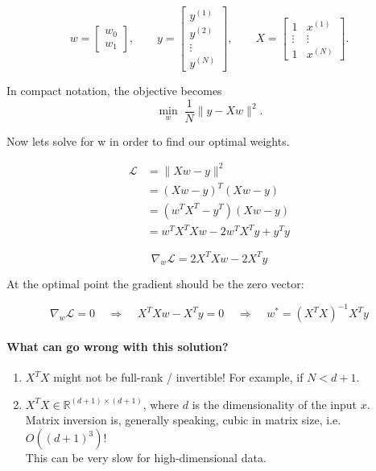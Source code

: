 \documentclass[11pt]{article}
\begin{document}
\[
	w =
	\begin{bmatrix}
		w_0 \\ w_1
	\end{bmatrix},
	\qquad
	y =
	\begin{bmatrix}
		y^{(1)} \\ y^{(2)} \\ \vdots \\ y^{(N)}
	\end{bmatrix},
	\qquad
	X =
	\begin{bmatrix}
		1      & x^{(1)} \\
		\vdots & \vdots  \\
		1      & x^{(N)}
	\end{bmatrix}.
\]

In compact notation, the objective becomes
\[
	\min_{w} \; \frac{1}{N} \|y - Xw\|^2.
\]

Now lets solve for w in order to find our optimal weights.

\begin{align*}
	\mathcal{L} & = \|Xw - y\|^2                      \\
	            & = (Xw - y)^T (Xw - y)               \\
	            & = (w^T X^T - y^T)(Xw - y)           \\
	            & = w^T X^T X w - 2 w^T X^T y + y^T y
\end{align*}

\[
	\nabla_w \mathcal{L} = 2X^T X w - 2X^T y
\]

At the optimal point the gradient should be the zero vector:

\[
	\nabla_w \mathcal{L} = 0 \;\;\;\;\Rightarrow\;\;\;\; X^T X w - X^T y = 0
	\;\;\;\;\Rightarrow\;\;\;\; w^* = (X^T X)^{-1} X^T y
\]


\paragraph{What can go wrong with this solution?}
\begin{enumerate}
	\item $X^T X$ might not be full-rank / invertible! For example, if $N < d+1$.
	\item $X^T X \in \mathbb{R}^{(d+1) \times (d+1)}$, where $d$ is the dimensionality of the input $x$. \\
	      Matrix inversion is, generally speaking, cubic in matrix size, i.e.\ $O((d+1)^3)$! \\
	      This can be very slow for high-dimensional data.
\end{enumerate}
\end{document}
